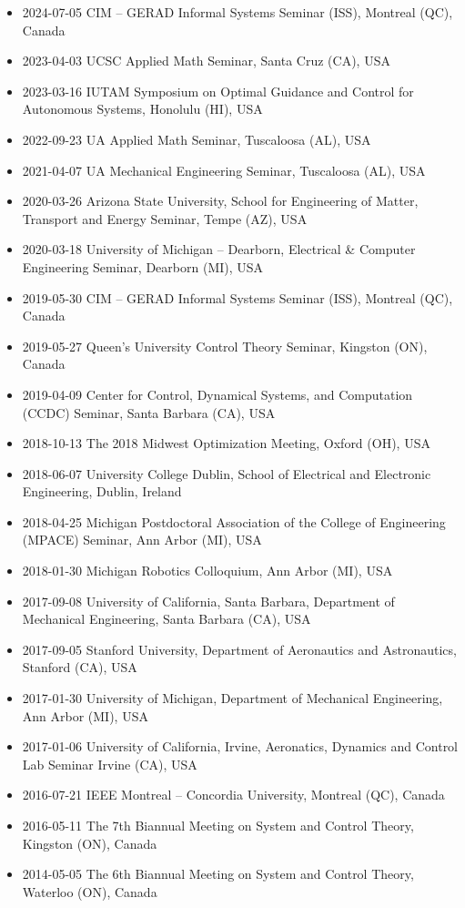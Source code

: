 \documentclass{article}
\begin{document}
\begin{itemize}
\setlength\itemsep{-2 pt}
\setlength{\itemindent}{-25 pt}
\item[] {2024-07-05} {CIM -- GERAD Informal Systems Seminar (ISS), \hfill Montreal (QC), Canada}
\item[] {2023-04-03} {UCSC Applied Math Seminar, \hfill  Santa Cruz (CA), USA}
\item[] {2023-03-16} {IUTAM Symposium on Optimal Guidance and Control for Autonomous Systems, \hfill Honolulu (HI), USA}
\item[] {2022-09-23} {UA Applied Math Seminar, \hfill Tuscaloosa  (AL), USA}
\item[] {2021-04-07} {UA Mechanical Engineering Seminar, \hfill Tuscaloosa (AL), USA}
\item[] {2020-03-26} {Arizona State University, 
School for Engineering of Matter, Transport and Energy %
Seminar, \hfill Tempe (AZ), USA}
\item[] {2020-03-18} {University of Michigan -- Dearborn, Electrical \& Computer Engineering Seminar, \hfill Dearborn  (MI), USA}
\item[] {2019-05-30} {CIM -- GERAD Informal Systems Seminar (ISS), \hfill Montreal (QC), Canada}
\item[] {2019-05-27} {Queen's University Control Theory Seminar, \hfill Kingston (ON), Canada}
\item[] {2019-04-09} {Center for Control, Dynamical Systems, and Computation (CCDC) Seminar, \hfill Santa Barbara (CA), USA}
\item[] {2018-10-13} {The 2018 Midwest Optimization Meeting, \hfill Oxford (OH), USA}
\item[] {2018-06-07} {University College Dublin, School of Electrical and Electronic Engineering, \hfill Dublin, Ireland}
\item[] {2018-04-25} {Michigan Postdoctoral Association of the College of Engineering (MPACE) Seminar, \hfill Ann Arbor (MI), USA}
\item[] {2018-01-30} {Michigan Robotics Colloquium, \hfill Ann Arbor (MI), USA}
\item[] {2017-09-08} {University of California, Santa Barbara, Department of Mechanical Engineering, \hfill Santa Barbara (CA), USA}
\item[] {2017-09-05} {Stanford University, Department of Aeronautics and Astronautics, \hfill Stanford (CA), USA}
\item[] {2017-01-30} {University of Michigan, Department of Mechanical Engineering, \hfill Ann Arbor (MI), USA}
\item[] {2017-01-06} {University of California, Irvine,  Aeronatics, Dynamics and Control Lab Seminar \hfill Irvine (CA), USA}
\item[] {2016-07-21} {IEEE Montreal -- Concordia University, \hfill Montreal (QC), Canada}
\item[] {2016-05-11} {The 7th Biannual Meeting on System and Control Theory, \hfill Kingston (ON), Canada}
\item[] {2014-05-05} {The 6th Biannual Meeting on System and Control Theory, \hfill Waterloo (ON), Canada}
\end{itemize}
\end{document}

